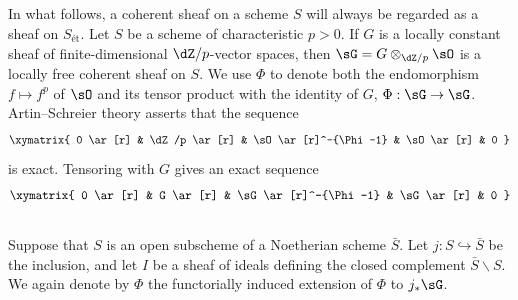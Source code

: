 \documentclass[12pt,oneside,english]{smfbook}
\newcounter{char}
\renewcommand{\setminus}{\smallsetminus}
\begin{document}
\subsection{}\label{III:3-1}

In what follows, a coherent sheaf on a scheme $S$ will always be regarded as a sheaf on $S_\text{ét}$. Let $S$ be a scheme of characteristic $p>0$. If $G$ is a locally constant sheaf of finite-dimensional $\dZ/p$-vector spaces, then $\sG=G\otimes_{\dZ/p}\sO$ is a locally free coherent sheaf on $S$. We use $\Phi$ to denote both the endomorphism $f\mapsto f^p$ of $\sO$ and its tensor product with the identity of $G$, $\Phi:\sG\to\sG$. Artin--Schreier theory \cite[IX 3.5]{sga4} asserts that the sequence
\[\xymatrix{
  0 \ar[r]
    & \dZ/p \ar[r]
    & \sO \ar[r]^-{\Phi-1}
    & \sO \ar[r]
    & 0
}\]
is exact. Tensoring with $G$ gives an exact sequence
\[\xymatrix{
  0 \ar[r]
    & G \ar[r]
    & \sG \ar[r]^-{\Phi-1}
    & \sG \ar[r]
    & 0
}\]

\subsection{}\label{III:3-2}

Suppose that $S$ is an open subscheme of a Noetherian scheme $\bar S$. Let $j:S\hookrightarrow\bar S$ be the inclusion, and let $I$ be a sheaf of ideals defining the closed complement $\bar S\setminus S$. We again denote by $\Phi$ the functorially induced extension of $\Phi$ to $j_*\sG$.
\end{document}
